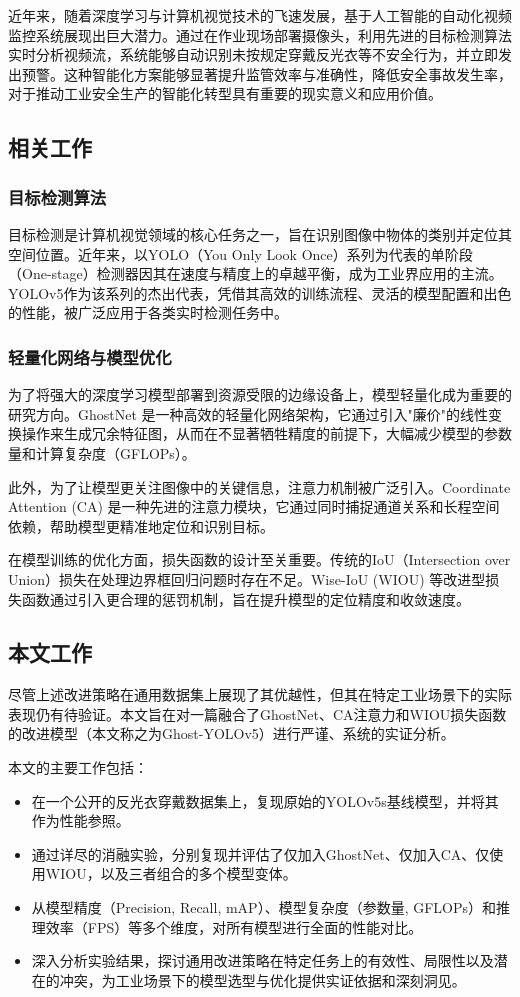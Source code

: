 \documentclass[a4paper]{ctexart}
\begin{document}
近年来，随着深度学习与计算机视觉技术的飞速发展，基于人工智能的自动化视频监控系统展现出巨大潜力。通过在作业现场部署摄像头，利用先进的目标检测算法实时分析视频流，系统能够自动识别未按规定穿戴反光衣等不安全行为，并立即发出预警。这种智能化方案能够显著提升监管效率与准确性，降低安全事故发生率，对于推动工业安全生产的智能化转型具有重要的现实意义和应用价值。

\subsection{相关工作}
\subsubsection{目标检测算法}
目标检测是计算机视觉领域的核心任务之一，旨在识别图像中物体的类别并定位其空间位置。近年来，以YOLO（You Only Look Once）系列为代表的单阶段（One-stage）检测器因其在速度与精度上的卓越平衡，成为工业界应用的主流。YOLOv5作为该系列的杰出代表，凭借其高效的训练流程、灵活的模型配置和出色的性能，被广泛应用于各类实时检测任务中。

\subsubsection{轻量化网络与模型优化}
为了将强大的深度学习模型部署到资源受限的边缘设备上，模型轻量化成为重要的研究方向。GhostNet \cite{ghostnet} 是一种高效的轻量化网络架构，它通过引入"廉价"的线性变换操作来生成冗余特征图，从而在不显著牺牲精度的前提下，大幅减少模型的参数量和计算复杂度（GFLOPs）。

此外，为了让模型更关注图像中的关键信息，注意力机制被广泛引入。Coordinate Attention (CA) \cite{ca} 是一种先进的注意力模块，它通过同时捕捉通道关系和长程空间依赖，帮助模型更精准地定位和识别目标。

在模型训练的优化方面，损失函数的设计至关重要。传统的IoU（Intersection over Union）损失在处理边界框回归问题时存在不足。Wise-IoU (WIOU) \cite{wiou} 等改进型损失函数通过引入更合理的惩罚机制，旨在提升模型的定位精度和收敛速度。

\subsection{本文工作}
尽管上述改进策略在通用数据集上展现了其优越性，但其在特定工业场景下的实际表现仍有待验证。本文旨在对一篇融合了GhostNet、CA注意力和WIOU损失函数的改进模型（本文称之为Ghost-YOLOv5）进行严谨、系统的实证分析。

本文的主要工作包括：
\begin{itemize}
    \item 在一个公开的反光衣穿戴数据集上，复现原始的YOLOv5s基线模型，并将其作为性能参照。
    \item 通过详尽的消融实验，分别复现并评估了仅加入GhostNet、仅加入CA、仅使用WIOU，以及三者组合的多个模型变体。
    \item 从模型精度（Precision, Recall, mAP）、模型复杂度（参数量, GFLOPs）和推理效率（FPS）等多个维度，对所有模型进行全面的性能对比。
    \item 深入分析实验结果，探讨通用改进策略在特定任务上的有效性、局限性以及潜在的冲突，为工业场景下的模型选型与优化提供实证依据和深刻洞见。
\end{itemize}
\end{document}
